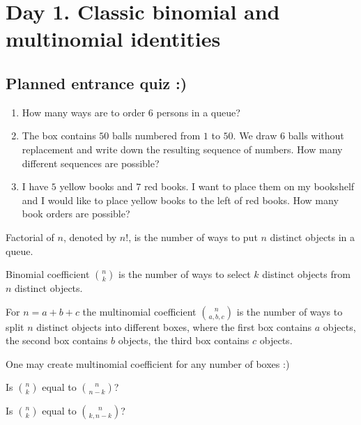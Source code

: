 \documentclass[12pt]{article}
\begin{document}

\tableofcontents{}


\section{Day 1. Classic binomial and multinomial identities}

\subsection*{Planned entrance quiz :)}

\begin{enumerate}
\item How many ways are to order $6$ persons in a queue?
\item The box contains $50$ balls numbered from $1$ to $50$. We draw $6$ balls without replacement and write down the resulting sequence of numbers.
How many different sequences are possible?
\item I have $5$ yellow books and $7$ red books. I want to place them on my bookshelf and I would like to place yellow books to the left of red books. 
How many book orders are possible?
\end{enumerate}


\begin{definition}
    Factorial of $n$, denoted by $n!$, is the number of ways to put $n$ distinct objects in a queue. 
\end{definition}


\begin{definition}
    Binomial coefficient $n \choose k$ is the number of ways to select $k$ distinct objects from $n$ distinct objects.
\end{definition}

\begin{definition}
    For $n = a + b + c$ the multinomial coefficient $n \choose a, b, c$ is the number of ways to split $n$ distinct objects into different boxes, 
    where the first box contains $a$ objects, the second box contains $b$ objects, the third box contains $c$ objects. 

    One may create multinomial coefficient for any number of boxes :)
\end{definition}


\begin{exercise}
Is $n \choose k$ equal to $n \choose n-k$? 

Is $n \choose k$ equal to $n \choose k, n-k$?
\end{exercise}
\end{document}
